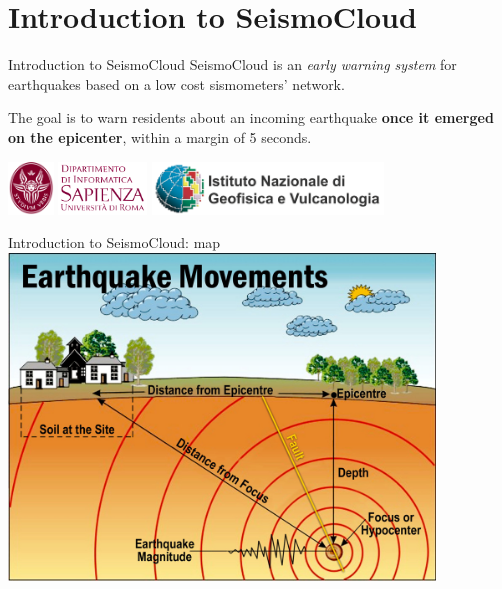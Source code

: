 
\section{Introduction to SeismoCloud}

\begin{frame}{Introduction to SeismoCloud}
SeismoCloud is an \textit{early warning system} for earthquakes based on a low
cost sismometers' network.

The goal is to warn residents about an incoming earthquake \textbf{once it
emerged on the epicenter}, within a margin of 5  seconds.

\vspace{1em}
\centering
\includegraphics[keepaspectratio=true,height=40pt]{dipartimentologo}
\includegraphics[keepaspectratio=true,height=40pt]{dipartimento}
\hspace{1em}
\includegraphics[keepaspectratio=true,height=40pt]{ingv}

\end{frame}


\begin{frame}{Introduction to SeismoCloud: map}
\centering
\includegraphics[keepaspectratio=true,width=0.85\textwidth]{earthquake-points}
\end{frame}
